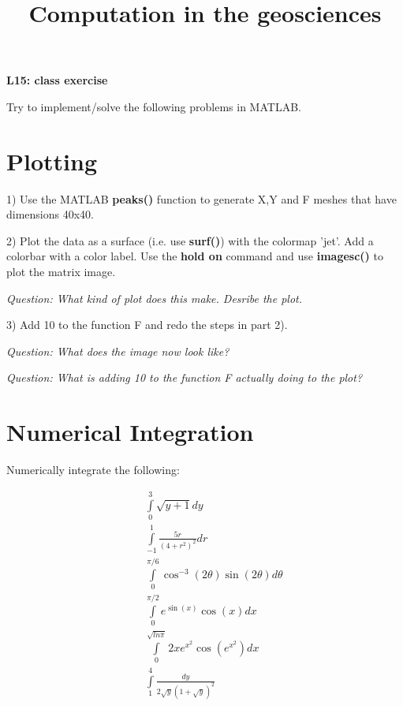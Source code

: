 \documentclass[10pt,fleqn]{article}
\title{Computation in the geosciences}
\date{\empty}
\begin{document}
\begin{multicols}{2}
\textbf{L15: class exercise}
\end{multicols}

Try to implement/solve the following problems in MATLAB.


\section*{Plotting}

1) Use the MATLAB \textbf{peaks()} function to generate X,Y and F meshes that have dimensions 40x40.

2) Plot the data as a surface (i.e. use \textbf{surf()}) with the colormap 'jet'. Add a colorbar with a color label. Use the \textbf{hold on} command and use \textbf{imagesc()} to plot the matrix image.

\textit{Question: What kind of plot does this make. Desribe the plot.}

3) Add 10 to the function F and redo the steps in part 2). 

\textit{Question: What does the image now look like?}

\textit{Question: What is adding 10 to the function F actually doing to the plot?}


\section*{Numerical Integration}

Numerically integrate the following:

\begin{eqnarray} \nonumber
&& \int\limits_0^{3} \sqrt{y+1} dy \\ \nonumber
&& \int\limits_{-1}^{1} \frac{5r}{(4+r^2)^2} dr  \\ \nonumber
&& \int\limits_0^{\pi/6} \cos^{-3}(2\theta) \sin(2\theta) d\theta \\ \nonumber
&& \int\limits_0^{\pi/2} e^{\sin(x)}\cos(x) dx \\ \nonumber
&& \int\limits_0^{\sqrt{ln\pi}} 2xe^{x^2}\cos(e^{x^2}) dx  \\ \nonumber
&& \int\limits_1^{4} \frac{dy}{2\sqrt{y}(1+\sqrt{y})^2}  \\ \nonumber
\end{eqnarray}
\end{document}
